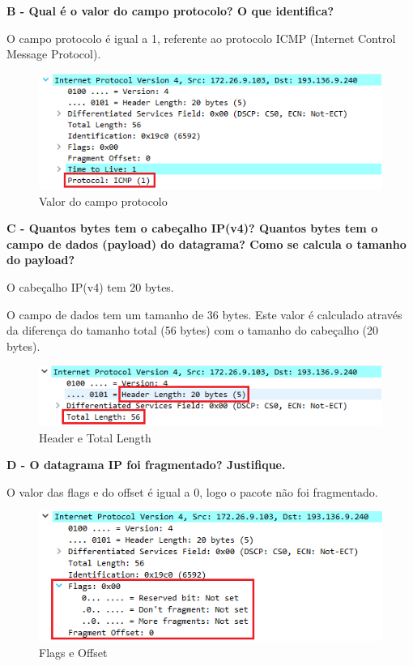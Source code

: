 \documentclass[11pt]{article}
\begin{document}
\vspace{0.5cm}

\textbf{B - Qual é o valor do campo protocolo? O que identifica?}

O campo protocolo é igual a 1, referente ao protocolo ICMP (Internet Control Message Protocol).

\begin{figure}[hbt!]
    \centering
    \includegraphics[width=\textwidth]{images/parte1/default/campo_protocolo.png}
    \caption{Valor do campo protocolo}
\end{figure}

\clearpage

\textbf{C - Quantos bytes tem o cabeçalho IP(v4)? Quantos bytes tem o campo de dados (payload) do datagrama? Como se calcula o tamanho do payload?}

O cabeçalho IP(v4) tem 20 bytes.

O campo de dados tem um tamanho de 36 bytes. Este valor é calculado através da diferença do tamanho total (56 bytes) com o tamanho do cabeçalho (20 bytes).

\begin{figure}[hbt!]
    \centering
    \includegraphics[width=\textwidth]{images/parte1/default/header_total_length.png}
    \caption{Header e Total Length}
\end{figure}

\vspace{0.5cm}

\textbf{D - O datagrama IP foi fragmentado? Justifique.}

O valor das flags e do offset é igual a 0, logo o pacote não foi fragmentado.

\begin{figure}[hbt!]
    \centering
    \includegraphics[width=\textwidth]{images/parte1/default/flags.png}
    \caption{Flags e Offset}
\end{figure}
\end{document}
